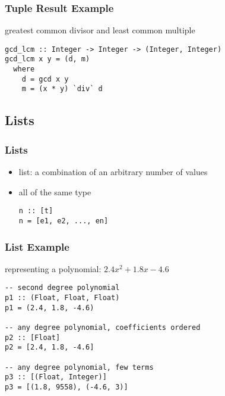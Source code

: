 \documentclass[dvipsnames]{beamer}
\theoremstyle{plain}
\begin{document}
\begin{frame}[fragile]
  \frametitle{Tuple Result Example}

  \begin{exampleblock}{greatest common divisor and least common multiple}
    \begin{lstlisting}
gcd_lcm :: Integer -> Integer -> (Integer, Integer)
gcd_lcm x y = (d, m)
  where
    d = gcd x y
    m = (x * y) `div` d
    \end{lstlisting}
  \end{exampleblock}
\end{frame}

\subsection{Lists}

\begin{frame}[fragile]
  \frametitle{Lists}

  \begin{itemize}
    \item \alert{list}: a combination of an arbitrary number of values
    \item all of the same type

    \smallskip
    \begin{lstlisting}[style=syntax]
n :: [t]
n = [e1, e2, ..., en]
    \end{lstlisting}
  \end{itemize}
\end{frame}

\begin{frame}[fragile]
  \frametitle{List Example}

  \begin{exampleblock}{representing a polynomial: $2.4x^2 + 1.8x - 4.6$}
    \begin{lstlisting}
-- second degree polynomial
p1 :: (Float, Float, Float)
p1 = (2.4, 1.8, -4.6)

-- any degree polynomial, coefficients ordered
p2 :: [Float]
p2 = [2.4, 1.8, -4.6]

-- any degree polynomial, few terms
p3 :: [(Float, Integer)]
p3 = [(1.8, 9558), (-4.6, 3)]
    \end{lstlisting}
  \end{exampleblock}
\end{frame}
\end{document}

